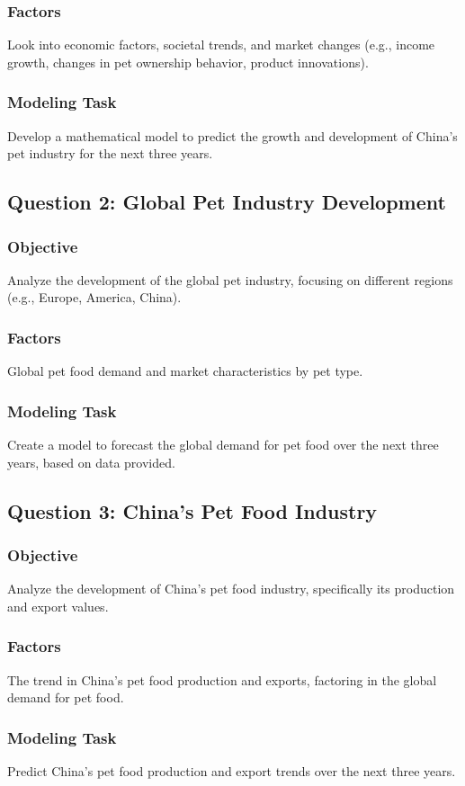 \documentclass[withoutpreface,bwprint]{cumcmthesis} %
\begin{document}
\subsubsection{Factors}
Look into economic factors, societal trends, and market changes (e.g., income growth, changes in pet ownership behavior, product innovations).
\subsubsection{Modeling Task}
Develop a mathematical model to predict the growth and development of China's pet industry for the next three years.
\subsection{Question 2: Global Pet Industry Development}
\subsubsection{Objective}
Analyze the development of the global pet industry, focusing on different regions (e.g., Europe, America, China).
\subsubsection{Factors}
Global pet food demand and market characteristics by pet type.
\subsubsection{Modeling Task}
Create a model to forecast the global demand for pet food over the next three years, based on data provided.
\subsection{Question 3: China's Pet Food Industry}
\subsubsection{Objective}
Analyze the development of China's pet food industry, specifically its production and export values.
\subsubsection{Factors}
The trend in China's pet food production and exports, factoring in the global demand for pet food.
\subsubsection{Modeling Task}
Predict China's pet food production and export trends over the next three years.
\end{document}
